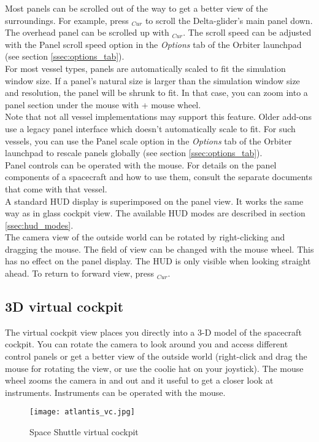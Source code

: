 \documentclass[Orbiter User Manual.tex]{subfiles}
\begin{document}
\noindent
Most panels can be scrolled out of the way to get a better view of the surroundings. For example, press \DArrow$_{Cur}$ to scroll the Delta-glider's main panel down. The overhead panel can be scrolled up with \UArrow$_{Cur}$. The scroll speed can be adjusted with the Panel scroll speed option in the \textit{Options} tab of the Orbiter launchpad (see section \ref{ssec:options_tab}).\\
For most vessel types, panels are automatically scaled to fit the simulation window size. If a panel's natural size is larger than the simulation window size and resolution, the panel will be shrunk to fit. In that case, you can zoom into a panel section under the mouse with \Ctrl + mouse wheel.\\
Note that not all vessel implementations may support this feature. Older add-ons use a legacy panel interface which doesn't automatically scale to fit. For such vessels, you can use the Panel scale option in the \textit{Options} tab of the Orbiter launchpad to rescale panels globally (see section \ref{ssec:options_tab}).\\
Panel controls can be operated with the mouse. For details on the panel components of a spacecraft and how to use them, consult the separate documents that come with that vessel.\\
A standard HUD display is superimposed on the panel view. It works the same way as in glass cockpit view. The available HUD modes are described in section \ref{ssec:hud_modes}.\\
The camera view of the outside world can be rotated by right-clicking and dragging the mouse. The field of view can be changed with the mouse wheel. This has no effect on the panel display. The HUD is only visible when looking straight ahead. To return to forward view, press \Home$_{Cur}$.


\subsection{3D virtual cockpit}
The virtual cockpit view places you directly into a 3-D model of the spacecraft cockpit. You can rotate the camera to look around you and access different control panels or get a better view of the outside world (right-click and drag the mouse for rotating the view, or use the coolie hat on your joystick). The mouse wheel zooms the camera in and out and it useful to get a closer look at instruments. Instruments can be operated with the mouse.

\begin{figure}[H]
  \centering
  \texttt{[image: atlantis\_vc.jpg]}
  \caption{Space Shuttle virtual cockpit}
\end{figure}
\end{document}
